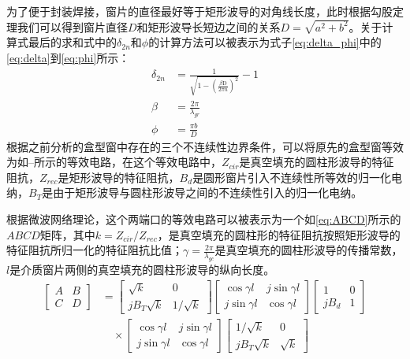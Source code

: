 \documentclass[master]{thesis-uestc}
\begin{document}
为了便于封装焊接，窗片的直径最好等于矩形波导的对角线长度，此时根据勾股定理我们可以得到窗片直径$D$和矩形波导长短边之间的关系$D=\sqrt{a^2+b^2} $。关于计算式最后的求和式中的$\delta_{2n}$和$\phi$的计算方法可以被表示为式子\ref{eq:delta_phi}中的\ref{eq:delta}到\ref{eq:phi}所示：
\begin{subequations}\label{eq:delta_phi}
\begin{align}
    \delta_{2 n} &= \frac{1}{\sqrt{1-\left(\frac{\beta \mathrm{D}}{2 \pi n}\right)^{2}}}-1 \label{eq:delta}\\
    \beta &= \frac{2 \pi}{\lambda_{gr}} \label{eq:beta}\\
    \phi &= \frac{\pi b}{D} \label{eq:phi}
\end{align}
\end{subequations}
根据之前分析的盒型窗中存在的三个不连续性边界条件，可以将原先的盒型窗等效为如--所示的等效电路，在这个等效电路中，$Z_{cir}$是真空填充的圆柱形波导的特征阻抗，$Z_{rec}$是矩形波导的特征阻抗，$B_{d}$是圆形窗片引入不连续性所等效的归一化电纳，$B_{T}$是由于矩形波导与圆柱形波导之间的不连续性引入的归一化电纳。

根据微波网络理论，这个两端口的等效电路可以被表示为一个如\ref{eq:ABCD}所示的$ABCD$矩阵，其中$k=Z_{cir}/Z_{rec}$，是真空填充的圆柱形的特征阻抗按照矩形波导的特征阻抗所归一化的特征阻抗比值；$\gamma=\frac{2 \pi}{\lambda_{gc}}$是真空填充的圆柱形波导的传播常数，$l$是介质窗片两侧的真空填充的圆柱形波导的纵向长度。
\begin{equation}\label{eq:ABCD}
    \begin{split}
        \begin{bmatrix}
            A & B \\
            C & D
        \end{bmatrix} 
        & = 
        \begin{bmatrix}
            \sqrt{k} & 0 \\
            jB_{T}\sqrt{k} & 1/\sqrt{k}
        \end{bmatrix}
        \begin{bmatrix}
            \cos{\gamma l} & j\sin{\gamma l} \\
            j\sin{\gamma l} & \cos{\gamma l}
        \end{bmatrix}
        \begin{bmatrix}
            1 & 0 \\
            jB_{d} & 1
        \end{bmatrix} \\
        & \quad \times 
        \begin{bmatrix}
            \cos{\gamma l} & j\sin{\gamma l} \\
            j\sin{\gamma l} & \cos{\gamma l}
        \end{bmatrix}
        \begin{bmatrix}
            1/\sqrt{k} & 0 \\
            jB_{T}\sqrt{k} & \sqrt{k}
        \end{bmatrix}
    \end{split}
\end{equation}
\end{document}
